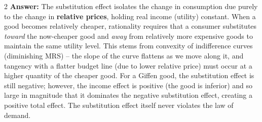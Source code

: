 \documentclass[10pt,a4paper]{article}
\begin{document}
\begin{multicols}{2}
\vspace{0.1cm}
\textbf{Answer:} The substitution effect isolates the change in consumption due purely to the change in \textbf{relative prices}, holding real income (utility) constant. When a good becomes relatively cheaper, rationality requires that a consumer substitutes \textit{toward} the now-cheaper good and \textit{away} from relatively more expensive goods to maintain the same utility level. This stems from convexity of indifference curves (diminishing MRS) -- the slope of the curve flattens as we move along it, and tangency with a flatter budget line (due to lower relative price) must occur at a higher quantity of the cheaper good. For a Giffen good, the substitution effect is still negative; however, the income effect is positive (the good is inferior) and so large in magnitude that it dominates the negative substitution effect, creating a positive total effect. The substitution effect itself never violates the law of demand.

\end{multicols}
\end{document}
